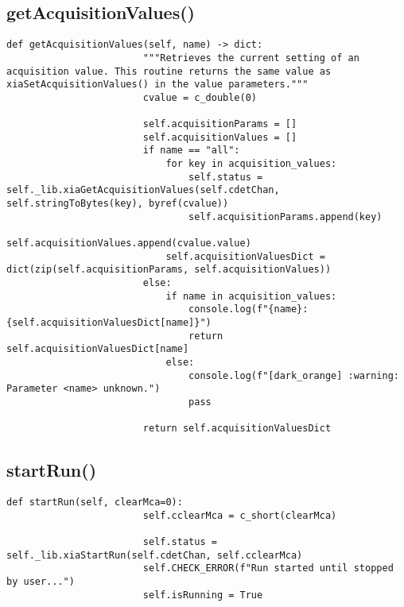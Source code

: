             \subsection{getAcquisitionValues()}
                \begin{lstlisting}[style=mypython, firstnumber=133, caption={[XMagix method getAcquisitionValues()]XMagix method getAcquisitionValues().}, label={lst:xmagix getAcquisitionValues}, gobble=16]
                    def getAcquisitionValues(self, name) -> dict:
                        """Retrieves the current setting of an acquisition value. This routine returns the same value as xiaSetAcquisitionValues() in the value parameters."""
                        cvalue = c_double(0)

                        self.acquisitionParams = []
                        self.acquisitionValues = []
                        if name == "all":
                            for key in acquisition_values:
                                self.status = self._lib.xiaGetAcquisitionValues(self.cdetChan, self.stringToBytes(key), byref(cvalue))
                                self.acquisitionParams.append(key)
                                self.acquisitionValues.append(cvalue.value)
                            self.acquisitionValuesDict = dict(zip(self.acquisitionParams, self.acquisitionValues))
                        else:
                            if name in acquisition_values:
                                console.log(f"{name}: {self.acquisitionValuesDict[name]}")
                                return self.acquisitionValuesDict[name]
                            else:
                                console.log(f"[dark_orange] :warning: Parameter <name> unknown.")
                                pass
                                
                        return self.acquisitionValuesDict
                \end{lstlisting}
            
            \subsection{startRun()}
                \begin{lstlisting}[style=mypython, firstnumber=217, caption={[XMagix method startRun()]XMagix method startRun().}, label={lst:xmagix startRun}, gobble=16]
                    def startRun(self, clearMca=0):
                        self.cclearMca = c_short(clearMca)
                
                        self.status = self._lib.xiaStartRun(self.cdetChan, self.cclearMca)
                        self.CHECK_ERROR(f"Run started until stopped by user...")
                        self.isRunning = True
                \end{lstlisting}

